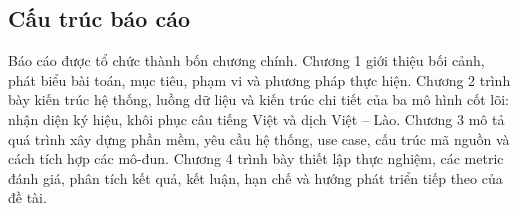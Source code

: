 ﻿\subsection{Cấu trúc báo cáo}

Báo cáo được tổ chức thành bốn chương chính. Chương 1 giới thiệu bối cảnh, phát biểu bài toán, mục tiêu, phạm vi và phương pháp thực hiện. Chương 2 trình bày kiến trúc hệ thống, luồng dữ liệu và kiến trúc chi tiết của ba mô hình cốt lõi: nhận diện ký hiệu, khôi phục câu tiếng Việt và dịch Việt -- Lào. Chương 3 mô tả quá trình xây dựng phần mềm, yêu cầu hệ thống, use case, cấu trúc mã nguồn và cách tích hợp các mô-đun. Chương 4 trình bày thiết lập thực nghiệm, các metric đánh giá, phân tích kết quả, kết luận, hạn chế và hướng phát triển tiếp theo của đề tài.

